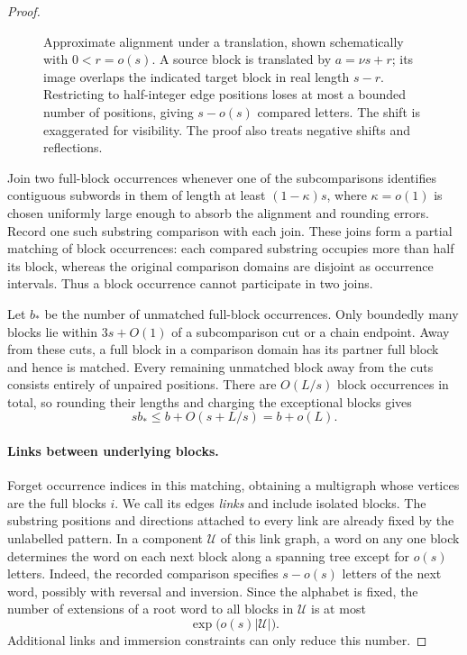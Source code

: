 \begin{proof}
\begin{figure}[htbp]
\centering

\caption{Approximate alignment under a translation, shown schematically
with \(0<r=o(s)\). A source block is translated by \(a=\nu s+r\);
its image overlaps the indicated target block in real length \(s-r\).
Restricting to half-integer edge positions loses at most a bounded
number of positions, giving \(s-o(s)\) compared letters. The shift is
exaggerated for visibility. The proof also treats negative shifts and
reflections.}
\label{fig:block-alignment}
\end{figure}

Join two full-block occurrences whenever one of the subcomparisons
identifies contiguous subwords in them of length at least
\((1-\kappa)s\), where \(\kappa=o(1)\) is chosen uniformly large enough
to absorb the alignment and rounding errors.  Record one such substring
comparison with each join.  These joins form a partial matching of
block occurrences: each compared substring occupies more than half its
block, whereas the original comparison domains are disjoint as
occurrence intervals.  Thus a block occurrence cannot participate in
two joins.

Let \(b_*\) be the number of unmatched full-block occurrences.  Only
boundedly many blocks lie within \(3s+O(1)\) of a subcomparison cut or a
chain endpoint.  Away from these cuts, a full block in a comparison
domain has its partner full block and hence is matched.  Every remaining
unmatched block away from the cuts consists entirely of unpaired
positions.  There are \(O(L/s)\) block occurrences in total, so rounding
their lengths and charging the exceptional blocks gives
\begin{equation}
 sb_*\le b+O(s+L/s)=b+o(L).
 \label{eq:entropy-unmatched-blocks}
\end{equation}

\paragraph{Links between underlying blocks.}
Forget occurrence indices in this matching, obtaining a multigraph
whose vertices are the full blocks \(i\).  We call its edges
\emph{links} and include isolated blocks.  The substring positions and
directions attached to every link are already fixed by the unlabelled
pattern.  In a component \(\mathcal U\) of this link graph, a word on any
one block determines the word on each next block along a spanning tree
except for \(o(s)\) letters.  Indeed, the recorded comparison specifies
\(s-o(s)\) letters of the next word, possibly with reversal and
inversion.  Since the alphabet is fixed, the number of extensions of a
root word to all blocks in \(\mathcal U\) is at most
\begin{equation}
 \exp\bigl(o(s)|\mathcal U|\bigr).
 \label{eq:entropy-propagation}
\end{equation}
Additional links and immersion constraints can only reduce this number.


\end{proof}
